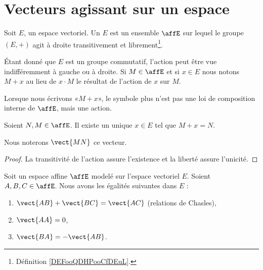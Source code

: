 
\section{Vecteurs agissant sur un espace}

\begin{definition}
    Soit \( E\), un espace vectoriel. Un  \( E\) est un ensemble \( \affE\) sur lequel le groupe \( (E,+)\) agit à droite transitivement et librement\footnote{Définition \ref{DEFooQDHPooCfDEuL}.}.
\end{definition}

Étant donné que \( E\) est un groupe commutatif, l'action peut être vue indifféremment à gauche ou à droite. Si \( M\in\affE\) et si \( x\in E\) nous notons \( M+x\) au lieu de \( x\cdot M\) le résultat de l'action de \( x\) sur \( M\).

\begin{normaltext}      \label{NORMooZANAooQdXqlh}
    Lorsque nous écrivons «\( M+x\)», le symbole plus n'est pas une loi de composition interne de \( \affE\), mais une action.
\end{normaltext}

\begin{propositionDef}      \label{DEFooWAYTooMLbqEE}
    Soient \( N,M\in\affE\). Il existe un unique \( x\in E\) tel que \( M+x=N\). 

    Nous noterons \( \vect{ MN }\) ce vecteur.
\end{propositionDef}

\begin{proof}
    La transitivité de l'action assure l'existence et la liberté assure l'unicité.
\end{proof}

\begin{proposition}     \label{PROPooCOZCooCghwaR}
    Soit un espace affine \( \affE\) modelé sur l'espace vectoriel \( E\). Soient \( A,B,C\in \affE\). Nous avons les égalités suivantes dans \( E\) :
    \begin{enumerate}
        \item   \label{ITEMooSDMIooUQiKeW}
            \( \vect{ AB }+\vect{ BC }=\vect{ AC }\) (relations de Chasles),
        \item   \label{ITEMooWZAVooGfGBwd}
            \( \vect{ AA }=0\),
        \item   \label{ITEMooLDVXooFZMbsQ}
            \( \vect{ BA }=-\vect{ AB }\).
    \end{enumerate}
\end{proposition}

